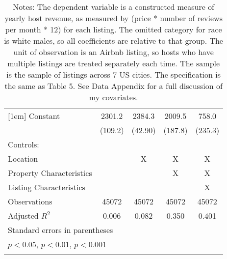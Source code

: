 {\begin{longtable}{l*{4}{c}}
[1em]
Constant            &      2301.2\sym{***}&      2384.3\sym{***}&      2009.5\sym{***}&       758.0\sym{**} \\
                    &     (109.2)         &     (42.90)         &     (187.8)         &     (235.3)         \\
\hline
Controls:        \\
\hspace{3mm} Location  &                &       X         &       X         &       X         \\
\hspace{3mm} Property Characteristics  &                &                &       X         &       X         \\
\hspace{3mm} Listing Characteristics  &                &                &                &       X         \\
\hline
Observations        &       45072         &       45072         &       45072         &       45072         \\
Adjusted \(R^{2}\)  &       0.006         &       0.082         &       0.350         &       0.401         \\
\hline\hline
\multicolumn{5}{l}{\footnotesize Standard errors in parentheses}\\
\multicolumn{5}{l}{\footnotesize \sym{*} \(p<0.05\), \sym{**} \(p<0.01\), \sym{***} \(p<0.001\)}\\
\caption*{Notes: The dependent variable is a constructed measure of yearly host revenue, as measured by (price * number of reviews per month * 12) for each listing. The omitted category for race is white males, so all coefficients are relative to that group. The unit of observation is an Airbnb listing, so hosts who have multiple listings are treated separately each time. The sample is the sample of listings across 7 US cities. The specification is the same as Table 5. See Data Appendix for a full discussion of my covariates. }
\end{longtable}
}

\begin{comment}
[1em]
Middle-aged         &       18.31         &       98.64\sym{*}  &      -33.37         &      -121.1\sym{***}\\
&     (55.99)         &     (44.60)         &     (36.71)         &     (36.42)         \\
[1em]
Old ($>$ 65)                 &       222.9         &       249.5         &      -73.13         &      -266.0\sym{*}  \\
&     (158.6)         &     (135.3)         &     (113.0)         &     (112.5)         \\
\end{comment}
